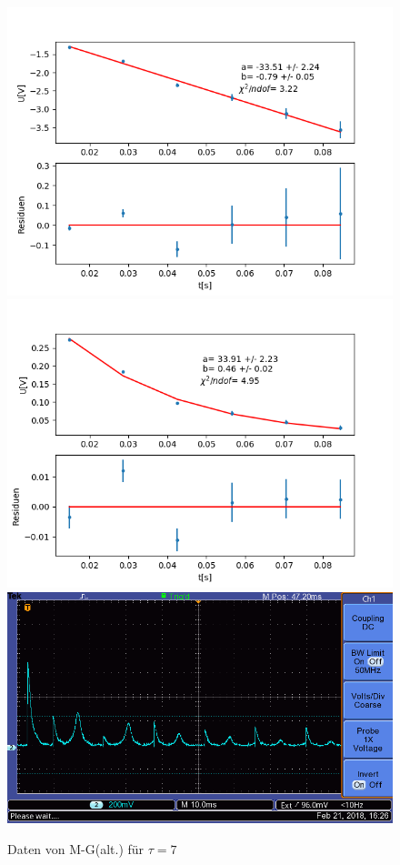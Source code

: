 \documentclass[12pt,a4paper]{article}
\begin{document}
\begin{figure}
\centering
\includegraphics[scale=0.5]{Bilder/T2Anhang/T2log7alt.png}
\includegraphics[scale=0.5]{Bilder/T2Anhang/T2exp7alt.png}
\includegraphics[scale=0.5]{Bilder/T2Anhang/T2plot7alt.png}
\caption{Daten von M-G(alt.) für $\tau = 7$}
\end{figure}
\end{document}
